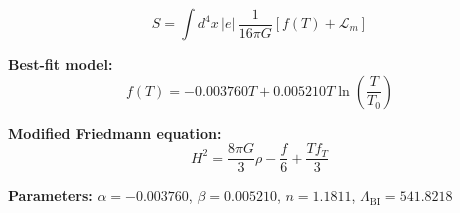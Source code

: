 
\begin{equation}
  S = \int d^4x \, |e| \, \frac{1}{16\pi G} \left[ f(T) + \mathcal{L}_m \right]
\end{equation}

\textbf{Best-fit model:}
\begin{equation}
  f(T) = -0.003760 T + 0.005210 T \ln\!\left(\frac{T}{T_0}\right)
\end{equation}

\textbf{Modified Friedmann equation:}
\begin{equation}
  H^2 = \frac{8\pi G}{3} \rho - \frac{f}{6} + \frac{T f_T}{3}
\end{equation}

\textbf{Parameters:}
$\alpha = -0.003760$, \quad
$\beta = 0.005210$, \quad
$n = 1.1811$, \quad
$\Lambda_{\text{BI}} = 541.8218$